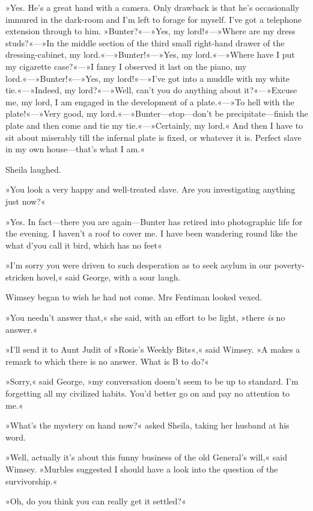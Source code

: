 »Yes. He's a great hand with a camera. Only drawback is that he's occasionally immured in the dark-room and I'm left to forage for myself. I've got a telephone extension through to him. »Bunter?«—»Yes, my lord!«—»Where are my dress studs?«—»In the middle section of the third small right-hand drawer of the dressing-cabinet, my lord.«—»Bunter!«—»Yes, my lord.«—»Where have I put my cigarette case?«—»I fancy I observed it last on the piano, my lord.«—»Bunter!«—»Yes, my lord!«—»I've got into a muddle with my white tie.«—»Indeed, my lord?«—»Well, can't you do anything about it?«—»Excuse me, my lord, I am engaged in the development of a plate.«—»To hell with the plate!«—»Very good, my lord.«—»Bunter—stop—don't be precipitate—finish the plate and then come and tie my tie.«—»Certainly, my lord.« And then I have to sit about miserably till the infernal plate is fixed, or whatever it is. Perfect slave in my own house—that's what I am.«

Sheila laughed.

»You look a very happy and well-treated slave. Are you investigating anything just now?«

»Yes. In fact—there you are again—Bunter has retired into photographic life for the evening. I haven't a roof to cover me. I have been wandering round like the what d'you call it bird, which has no feet\longdash«

»I'm sorry you were driven to such desperation as to seek asylum in our poverty-stricken hovel,« said George, with a sour laugh.

Wimsey began to wish he had not come. Mrs Fentiman looked vexed.

»You needn't answer that,« she said, with an effort to be light, »there \textit{is} no answer.«

»I'll send it to Aunt Judit of »Rosie's Weekly Bits«,« said Wimsey. »A makes a remark to which there is no answer. What is B to do?«

»Sorry,« said George, »my conversation doesn't seem to be up to standard. I'm forgetting all my civilized habits. You'd better go on and pay no attention to me.«

»What's the mystery on hand now?« asked Sheila, taking her husband at his word.

»Well, actually it's about this funny business of the old General's will,« said Wimsey. »Murbles suggested I should have a look into the question of the survivorship.«

»Oh, do you think you can really get it settled?«

